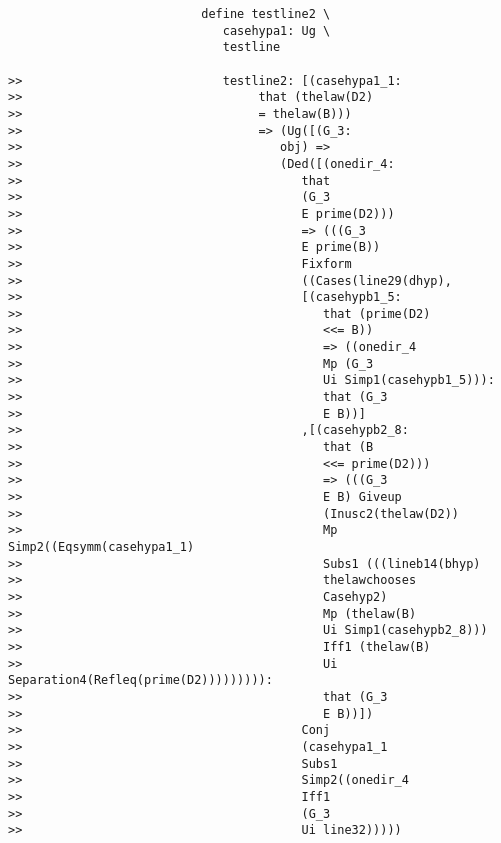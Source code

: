 \documentclass[12pt]{article}
\begin{document}
\begin{verbatim}
                           define testline2 \
                              casehypa1: Ug \
                              testline

>>                            testline2: [(casehypa1_1:
>>                                 that (thelaw(D2)
>>                                 = thelaw(B)))
>>                                 => (Ug([(G_3:
>>                                    obj) =>
>>                                    (Ded([(onedir_4:
>>                                       that
>>                                       (G_3
>>                                       E prime(D2)))
>>                                       => (((G_3
>>                                       E prime(B))
>>                                       Fixform
>>                                       ((Cases(line29(dhyp),
>>                                       [(casehypb1_5:
>>                                          that (prime(D2)
>>                                          <<= B))
>>                                          => ((onedir_4
>>                                          Mp (G_3
>>                                          Ui Simp1(casehypb1_5))):
>>                                          that (G_3
>>                                          E B))]
>>                                       ,[(casehypb2_8:
>>                                          that (B
>>                                          <<= prime(D2)))
>>                                          => (((G_3
>>                                          E B) Giveup
>>                                          (Inusc2(thelaw(D2))
>>                                          Mp Simp2((Eqsymm(casehypa1_1)
>>                                          Subs1 (((lineb14(bhyp)
>>                                          thelawchooses
>>                                          Casehyp2)
>>                                          Mp (thelaw(B)
>>                                          Ui Simp1(casehypb2_8)))
>>                                          Iff1 (thelaw(B)
>>                                          Ui Separation4(Refleq(prime(D2))))))))):
>>                                          that (G_3
>>                                          E B))])
>>                                       Conj
>>                                       (casehypa1_1
>>                                       Subs1
>>                                       Simp2((onedir_4
>>                                       Iff1
>>                                       (G_3
>>                                       Ui line32)))))

\end{verbatim}
\end{document}

